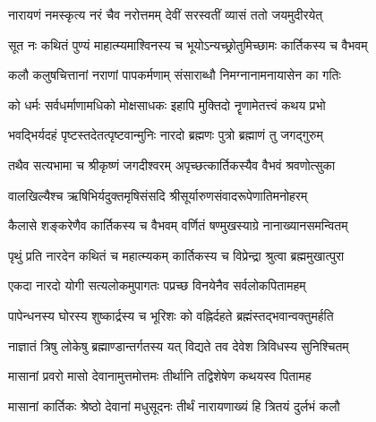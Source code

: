 \begingroup
\centering
\newcommand{\iti}[3]{\addtocounter{totalshlokas}{\value{shlokacount}}
{\centerline{\normalsize आदितः श्लोकाः — \devanumber{\value{totalshlokas}}}
॥इति श्रीस्कान्दे महापुराण एकाशीतिसाहस्र्यां संहितायां\\ द्वितीये वैष्णवखण्डे कार्तिकमासमाहात्म्ये\\#1\\ #2॥#3॥

\closesub
}}


\twolineshloka
{नारायणं नमस्कृत्य नरं चैव नरोत्तमम्}
{देवीं सरस्वतीं व्यासं ततो जयमुदीरयेत्} %


\twolineshloka
{सूत नः कथितं पुण्यं माहात्म्यमाश्विनस्य च}
{भूयोऽन्यच्छ्रोतुमिच्छामः कार्तिकस्य च वैभवम्} %

\twolineshloka
{कलौ कलुषचित्तानां नराणां पापकर्मणाम्}
{संसाराब्धौ निमग्नानामनायासेन का गतिः} %

\twolineshloka
{को धर्मः सर्वधर्माणामधिको मोक्षसाधकः}
{इहापि मुक्तिदो नॄणामेतत्त्वं कथय प्रभो} %


\twolineshloka
{भवद्भिर्यदहं पृष्टस्तदेतत्पृष्टवान्मुनिः}
{नारदो ब्रह्मणः पुत्रो ब्रह्माणं तु जगद्गुरुम्} %

\twolineshloka
{तथैव सत्यभामा च श्रीकृष्णं जगदीश्वरम्}
{अपृच्छत्कार्तिकस्यैव वैभवं श्रवणोत्सुका} %

\twolineshloka
{वालखिल्यैश्च ऋषिभिर्यदुक्तमृषिसंसदि}
{श्रीसूर्यारुणसंवादरूपेणातिमनोहरम्} %

\twolineshloka
{कैलासे शङ्करेणैव कार्तिकस्य च वैभवम्}
{वर्णितं षण्मुखस्याग्रे नानाख्यानसमन्वितम्} %

\twolineshloka
{पृथुं प्रति नारदेन कथितं च महात्म्यकम्}
{कार्तिकस्य च विप्रेन्द्रा श्रुत्वा ब्रह्ममुखात्पुरा} %

\twolineshloka
{एकदा नारदो योगी सत्यलोकमुपागतः}
{पप्रच्छ विनयेनैव सर्वलोकपितामहम्} %


\twolineshloka
{पापेन्धनस्य घोरस्य शुष्कार्द्रस्य च भूरिशः}
{को वह्निर्दहते ब्रह्मंस्तद्भवान्वक्तुमर्हति} %

\twolineshloka
{नाज्ञातं त्रिषु लोकेषु ब्रह्माण्डान्तर्गतस्य यत्}
{विद्यते तव देवेश त्रिविधस्य सुनिश्चितम्} %

\twolineshloka
{मासानां प्रवरो मासो देवानामुत्तमोत्तमः}
{तीर्थानि तद्विशेषेण कथयस्व पितामह} %


\twolineshloka
{मासानां कार्तिकः श्रेष्ठो देवानां मधुसूदनः}
{तीर्थं नारायणाख्यं हि त्रितयं दुर्लभं कलौ} %


